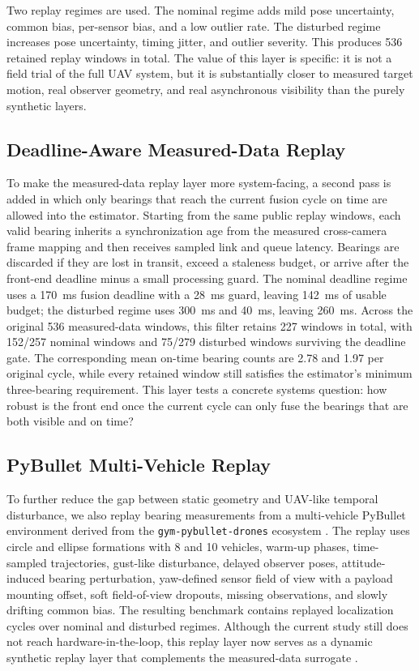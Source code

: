 \documentclass[drones,article,submit,pdftex,moreauthors]{Definitions/mdpi}
\begin{document}
Two replay regimes are used. The nominal regime adds mild pose uncertainty, common bias, per-sensor bias, and a low outlier rate. The disturbed regime increases pose uncertainty, timing jitter, and outlier severity. This produces 536 retained replay windows in total. The value of this layer is specific: it is not a field trial of the full UAV system, but it is substantially closer to measured target motion, real observer geometry, and real asynchronous visibility than the purely synthetic layers.

\subsection{Deadline-Aware Measured-Data Replay}

To make the measured-data replay layer more system-facing, a second pass is added in which only bearings that reach the current fusion cycle on time are allowed into the estimator. Starting from the same public replay windows, each valid bearing inherits a synchronization age from the measured cross-camera frame mapping and then receives sampled link and queue latency. Bearings are discarded if they are lost in transit, exceed a staleness budget, or arrive after the front-end deadline minus a small processing guard. The nominal deadline regime uses a 170~ms fusion deadline with a 28~ms guard, leaving 142~ms of usable budget; the disturbed regime uses 300~ms and 40~ms, leaving 260~ms. Across the original 536 measured-data windows, this filter retains 227 windows in total, with 152/257 nominal windows and 75/279 disturbed windows surviving the deadline gate. The corresponding mean on-time bearing counts are 2.78 and 1.97 per original cycle, while every retained window still satisfies the estimator's minimum three-bearing requirement. This layer tests a concrete systems question: how robust is the front end once the current cycle can only fuse the bearings that are both visible and on time?

\subsection{PyBullet Multi-Vehicle Replay}

To further reduce the gap between static geometry and UAV-like temporal disturbance, we also replay bearing measurements from a multi-vehicle PyBullet environment derived from the \texttt{gym-pybullet-drones} ecosystem \cite{panerati2021learning}. The replay uses circle and ellipse formations with 8 and 10 vehicles, warm-up phases, time-sampled trajectories, gust-like disturbance, delayed observer poses, attitude-induced bearing perturbation, yaw-defined sensor field of view with a payload mounting offset, soft field-of-view dropouts, missing observations, and slowly drifting common bias. The resulting benchmark contains replayed localization cycles over nominal and disturbed regimes. Although the current study still does not reach hardware-in-the-loop, this replay layer now serves as a dynamic synthetic replay layer that complements the measured-data surrogate \cite{perezsegui2023bridging}.
\end{document}
